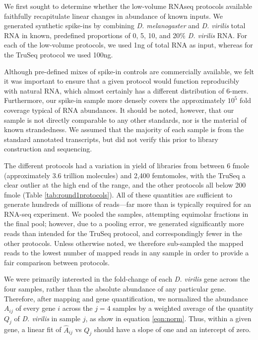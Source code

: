 We first sought to determine whether the low-volume RNAseq protocols available faithfully recapitulate linear changes in abundance of known inputs. We generated synthetic spike-ins by combining {\em D. melanogaster} and {\em D. virilis} total RNA in known, predefined proportions of 0, 5, 10, and 20\% {\em D. virilis} RNA. For each of the low-volume protocols, we used 1ng of total RNA as input, whereas for the TruSeq protocol we used 100ng.

Although pre-defined mixes of spike-in controls are commercially available, we felt it was important to ensure that a given protocol would function reproducibly with natural RNA, which almost certainly has a different distribution of 6-mers. Furthermore, our spike-in sample more densely covers the approximately $10^5$ fold coverage typical of RNA abundances.  It should be noted, however, that our sample is not directly comparable to any other standards, nor is the material of known strandedness.  We assumed that the majority of each sample is from the standard annotated transcripts, but did not verify this prior to library construction and sequencing.

The different protocols had a variation in yield of libraries from between 6 fmole (approximately 3.6 trillion molecules) and 2,400 femtomoles, with the TruSeq a clear outlier at the high end of the range, and the other protocols all below 200 fmole (Table \ref{tab:round1protocols}).  All of these quantities are sufficient to generate hundreds of millions of reads---far more than is typically required for an RNA-seq experiment. We pooled the samples, attempting equimolar fractions in the final pool; however, due to a pooling error, we generated significantly more reads than intended for the TruSeq protocol, and correspondingly fewer in the other protocols. Unless otherwise noted, we therefore sub-sampled the mapped reads to the lowest number of mapped reads in any sample in order to provide a fair comparison between protocols. 

We were primarily interested in the fold-change of each {\em D. virilis} gene across the four samples, rather than the absolute abundance of any particular gene. Therefore, after mapping and gene quantification, we normalized the abundance $A_{ij}$ of every gene $i$ across the $j=4$ samples by a weighted average of the quantity $Q_j$ of {\em D. virilis} in sample $j$, as show in equation \ref{eqn:norm}.  Thus, within a given gene, a linear fit of $\hat{A}_{ij}$ vs $Q_j$ should have a slope of one and an intercept of zero.

